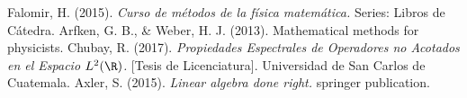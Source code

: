

\usepackage{fancyhdr}%
\pagestyle{fancy}%
\fancyhead{}
\fancyhead[R]{\footnotesize{\thepage}}
\fancyfoot{}
\usepackage{fourier-orns}

\renewcommand\footrule{%
\hrulefill
\raisebox{-2.1pt}
{\quad\decosix\quad}%
\hrulefill}
\newcommand{\inner}[2]{\langle #1 , #2 \rangle}
\newcommand{\metric}[2]{\rho(#1,#2)}	
\newcommand{\seque}[2]{\{ #1_{#2} \}}
\newcommand{\E}{\mathbf{E}}
\usetikzlibrary{shadows}



\begin{titlepage}






\pagebreak


\begin{thebibliography}{00}
 Falomir, H. (2015). \textit{Curso de métodos de la física matemática.} Series: Libros de Cátedra.
 Arfken, G. B., \& Weber, H. J. (2013). Mathematical methods for physicists.
 Chubay, R. (2017). \textit{Propiedades Espectrales de Operadores no Acotados en el Espacio $L^2 (\R)$.} [Tesis de Licenciatura]. Universidad de San Carlos de Cuatemala.
 Axler, S. (2015). \textit{Linear algebra done right.} springer publication.
\end{thebibliography}



\end{titlepage}

